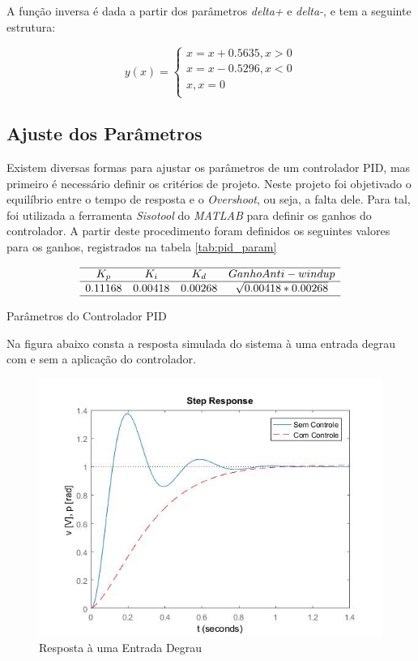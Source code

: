 \documentclass[a4paper,11pt]{article}
\begin{document}
A função inversa é dada a partir dos parâmetros \textit{delta+} e \textit{delta-}, e tem a seguinte estrutura:

\begin{equation}
    y(x) = 
    \left\{\begin{array}{c}
    x = x + 0.5635, x > 0 \\
    x = x - 0.5296, x < 0 \\
    x, x = 0 \\
\end{array} \right.
\end{equation}

\subsection{Ajuste dos Parâmetros}

Existem diversas formas para ajustar os parâmetros de um controlador PID, mas primeiro é necessário definir os critérios de projeto. Neste projeto foi objetivado o equilíbrio entre o tempo de resposta e o \textit{Overshoot}, ou seja, a falta dele. Para tal, foi utilizada a ferramenta \textit{Sisotool} do \textit{MATLAB} para definir os ganhos do controlador. A partir deste procedimento foram definidos os seguintes valores para os ganhos, registrados na tabela \ref{tab:pid_param}

\begin{table}[H]
    \centering
    $$\begin{array}{cccc}
    \hline
        K_p & K_i & K_d & Ganho Anti-windup \\
    \hline
        0.11168 & 0.00418 & 0.00268 & \sqrt{0.00418*0.00268}\\
     \hline
    \end{array}$$
    \caption{Parâmetros do Controlador PID}
    \label{tab:pid_param}
\end{table}

Na figura abaixo consta a resposta simulada do sistema à uma entrada degrau com e sem a aplicação do controlador.

\begin{figure}[H]
    \centering
    \includegraphics[width=0.6\linewidth]{tex/img/Resposta_ao_degrau.jpg}
    \caption{Resposta à uma Entrada Degrau}
    \label{fig:resposta_ao_degrau}
\end{figure}
\end{document}
